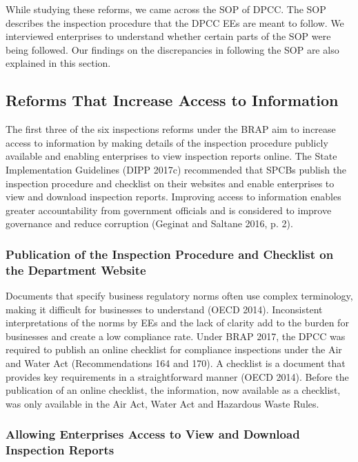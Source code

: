 \documentclass[a4paper, 12pt]{article}
\begin{document}
	While studying these reforms, we came across the SOP of DPCC. The SOP describes the inspection procedure that the DPCC EEs are meant to follow. We interviewed enterprises to understand whether certain parts of the SOP were being followed. Our findings on the discrepancies in following the SOP are also explained in this section. \\
	
	\subsection{Reforms That Increase Access to Information}
	
	The first three of the six inspections reforms under the BRAP aim to increase access to information by making details of the inspection procedure publicly available and enabling enterprises to view inspection reports online. The State Implementation Guidelines (DIPP 2017c) recommended that SPCBs publish the inspection procedure and checklist on their websites and enable enterprises to view and download inspection reports. Improving access to information enables greater accountability from government officials and is considered to improve governance and reduce corruption (Geginat and Saltane 2016, p. 2). \\
	
	\subsubsection{ Publication of the Inspection Procedure and Checklist on the Department Website}
	
	Documents that specify business regulatory norms often use complex terminology, making it difficult for businesses to understand (OECD 2014). Inconsistent interpretations of the norms by EEs and the lack of clarity add to the burden for businesses and create a low compliance rate. Under BRAP 2017, the DPCC was required to publish an online checklist for compliance inspections under the Air and Water Act (Recommendations 164 and 170). A checklist is a document that provides key requirements in a straightforward manner (OECD 2014). Before the publication of an online checklist, the information, now available as a checklist, was only available in the Air Act, Water Act and Hazardous Waste Rules. \\
	
	\subsubsection{Allowing Enterprises Access to View and Download Inspection Reports}
	
\end{document}
